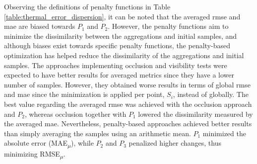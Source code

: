 Observing the definitions of penalty functions in Table \ref{table:thermal_error_dispersion}, it can be noted that the averaged \acrshort{rmse} and \acrshort{mae} are biased towards $P_1$ and $P_2$. However, the penalty functions aim to minimize the dissimilarity between the aggregations and initial samples, and although biases exist towards specific penalty functions, the penalty-based optimization has helped reduce the dissimilarity of the aggregations and initial samples. The approaches implementing occlusion and visibility tests were expected to have better results for averaged metrics since they have a lower number of samples. However, they obtained worse results in terms of global \acrshort{rmse} and \acrshort{mae} since the minimization is applied per point, $S_i$, instead of globally. The best value regarding the averaged \acrshort{rmse} was achieved with the occlusion approach and $P_2$, whereas occlusion together with $P_1$ lowered the dissimilarity measured by the averaged \acrshort{mae}. Nevertheless, penalty-based approaches achieved better results than simply averaging the samples using an arithmetic mean. $P_1$ minimized the absolute error (MAE\textsubscript{$\mu$}), while $P_2$ and $P_3$ penalized higher changes, thus minimizing RMSE\textsubscript{$\mu$}.


